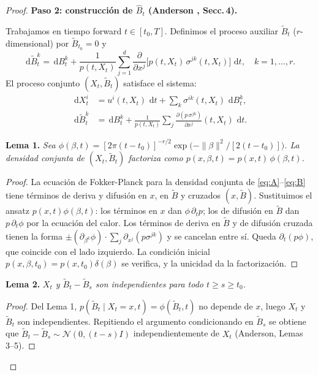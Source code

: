 \documentclass[12pt, a4paper]{report}
\theoremstyle{plain}
\theoremstyle{definition}
\theoremstyle{remark}
\newcommand{\dd}{\,\mathrm{d}}
\begin{document}
\begin{proof}
\medskip
\noindent\textbf{Paso 2: construcción de $\hat{B}_t$ (Anderson \cite{Anderson1982}, Secc.\,4).}

Trabajamos en tiempo forward $t \in [t_0, T]$. Definimos el proceso auxiliar $\tilde{B}_t$ ($r$-dimensional) por $\tilde{B}_{t_0} = 0$ y
\[
  \dd\tilde{B}_t^k = \dd B_t^k
  + \frac{1}{p(t,X_t)}\sum_{j=1}^d
    \frac{\partial}{\partial x^j}\bigl[p(t,X_t)\,\sigma^{jk}(t,X_t)\bigr]\,\dd t,
  \quad k=1,\ldots,r.
\]
El proceso conjunto $(X_t,\tilde{B}_t)$ satisface el sistema:
\begin{align}
  \dd X_t^i &= u^i(t,X_t)\,\dd t + \sum_k \sigma^{ik}(t,X_t)\,\dd B_t^k, \tag{A}\label{eq:A}\\[2pt]
  \dd\tilde{B}_t^k &= \dd B_t^k
    + \frac{1}{p(t,X_t)}\sum_j\frac{\partial(p\,\sigma^{jk})}{\partial x^j}(t,X_t)\,\dd t.
    \tag{B}\label{eq:B}
\end{align}

\smallskip
\noindent\textbf{Lema 1.}
\textit{Sea $\phi(\beta,t) = [2\pi(t-t_0)]^{-r/2}\exp\!\bigl(-\|\beta\|^2/[2(t-t_0)]\bigr)$. La densidad conjunta de $(X_t,\tilde{B}_t)$ factoriza como $p(x,\beta,t) = p(x,t)\,\phi(\beta,t)$.}
\begin{proof}
La ecuación de Fokker-Planck para la densidad conjunta de \eqref{eq:A}--\eqref{eq:B} tiene términos de deriva y difusión en $x$, en $\tilde{B}$ y cruzados $(x,\tilde{B})$. Sustituimos el ansatz $p(x,t)\phi(\beta,t)$: los términos en $x$ dan $\phi\,\partial_t p$; los de difusión en $\tilde{B}$ dan $p\,\partial_t\phi$ por la ecuación del calor. Los términos de deriva en $\tilde{B}$ y de difusión cruzada tienen la forma $\pm(\partial_{\beta^k}\phi)\cdot\sum_j\partial_{x^j}(p\sigma^{jk})$ y se cancelan entre sí. Queda $\partial_t(p\phi)$, que coincide con el lado izquierdo. La condición inicial $p(x,\beta,t_0)=p(x,t_0)\delta(\beta)$ se verifica, y la unicidad da la factorización.
\end{proof}

\smallskip
\noindent\textbf{Lema 2.}
\textit{$X_t$ y $\tilde{B}_t-\tilde{B}_s$ son independientes para todo $t\geq s\geq t_0$.}
\begin{proof}
Del Lema 1, $p(\tilde{B}_t\mid X_t=x,t)=\phi(\tilde{B}_t,t)$ no depende de $x$, luego $X_t$ y $\tilde{B}_t$ son independientes. Repitiendo el argumento condicionando en $\tilde{B}_s$ se obtiene que $\tilde{B}_t-\tilde{B}_s\sim\mathcal{N}(0,(t-s)I)$ independientemente de $X_t$ (Anderson, Lemas 3--5).
\end{proof}


\end{proof}
\end{document}

